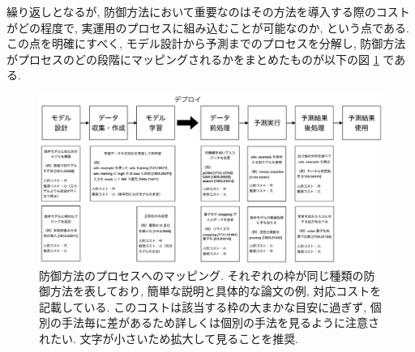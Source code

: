 繰り返しとなるが, 防御方法において重要なのはその方法を導入する際のコストがどの程度で, 実運用のプロセスに組み込むことが可能なのか, という点である.
この点を明確にすべく, モデル設計から予測までのプロセスを分解し, 防御方法がプロセスのどの段階にマッピングされるかをまとめたものが以下の図 \ref{fig:defense-process} である.
%
\begin{figure}[htbp]
\begin{center}
\includegraphics[width=16.0cm]{figures/defense-process.pdf}
\end{center}
\caption{
防御方法のプロセスへのマッピング.
それぞれの枠が同じ種類の防御方法を表しており, 簡単な説明と具体的な論文の例, 対応コストを記載している.
このコストは該当する枠の大まかな目安に過ぎず, 個別の手法毎に差があるため詳しくは個別の手法を見るように注意されたい.
文字が小さいため拡大して見ることを推奨.
}
\label{fig:defense-process}
\end{figure}
%